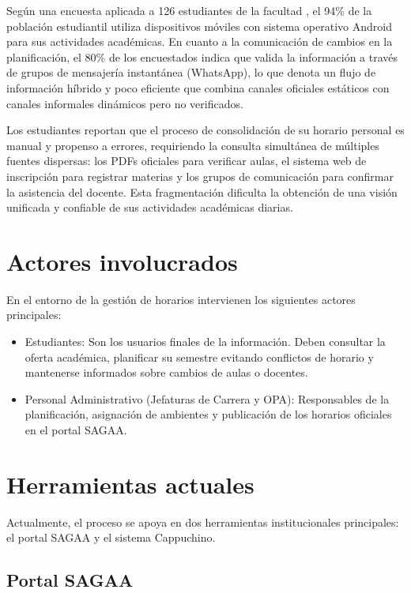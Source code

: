 Según una encuesta aplicada a 126 estudiantes de la facultad \cite{encuesta_fcyt_2025}, el 94\% de la población estudiantil utiliza dispositivos móviles con sistema operativo Android para sus actividades académicas. En cuanto a la comunicación de cambios en la planificación, el 80\% de los encuestados indica que valida la información a través de grupos de mensajería instantánea (WhatsApp), lo que denota un flujo de información híbrido y poco eficiente que combina canales oficiales estáticos con canales informales dinámicos pero no verificados.

Los estudiantes reportan que el proceso de consolidación de su horario personal es manual y propenso a errores, requiriendo la consulta simultánea de múltiples fuentes dispersas: los PDFs oficiales para verificar aulas, el sistema web de inscripción para registrar materias y los grupos de comunicación para confirmar la asistencia del docente. Esta fragmentación dificulta la obtención de una visión unificada y confiable de sus actividades académicas diarias.

\section{Actores involucrados}

En el entorno de la gestión de horarios intervienen los siguientes actores principales:

\begin{itemize}
    \item Estudiantes: Son los usuarios finales de la información. Deben consultar la oferta académica, planificar su semestre evitando conflictos de horario y mantenerse informados sobre cambios de aulas o docentes.
    \item Personal Administrativo (Jefaturas de Carrera y OPA): Responsables de la planificación, asignación de ambientes y publicación de los horarios oficiales en el portal SAGAA.
\end{itemize}

\section{Herramientas actuales}

Actualmente, el proceso se apoya en dos herramientas institucionales principales: el portal SAGAA y el sistema Cappuchino.

\subsection{Portal SAGAA}

